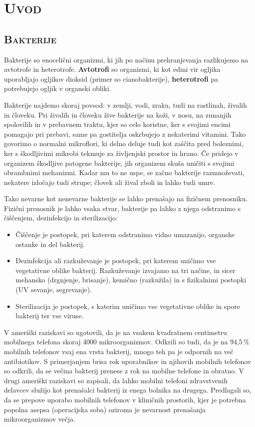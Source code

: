 \documentclass[12pt, a4paper]{report}
\begin{document}
\chapter{\textsc{Uvod}}

\section{\textsc{Bakterije}}

Bakterije so enocelični organizmi, ki jih po načinu prehranjevanja razlikujemo na avtotrofe in heterotrofe. \textbf{Avtotrofi} so organizmi, ki kot edini vir ogljika uporabljajo ogljikov dioksid (primer so cianobakterije), \textbf{heterotrofi} pa potrebujejo ogljik v organski obliki.

Bakterije najdemo skoraj povsod: v zemlji, vodi, zraku, tudi na rastlinah, živalih in človeku. Pri živalih in človeku žive bakterije na koži, v nosu, na zunanjih spolovilih in v prebavnem traktu, kjer so celo koristne, ker s svojimi encimi pomagajo pri prebavi, same pa gostitelja oskrbujejo z nekaterimi vitamini. Tako govorimo o normalni mikroflori, ki delno deluje tudi kot zaščita pred boleznimi, ker s škodljivimi mikrobi tekmuje za življenjski prostor in hrano. Če pridejo v organizem škodljive patogene bakterije, jih organizem skuša uničiti s svojimi obrambnimi mehanizmi. Kadar mu to ne uspe, se začno bakterije razmnoževati, nekatere izločajo tudi strupe; človek ali žival zboli in lahko tudi umre.

Tako nevarne kot nenevarne bakterije se lahko prenašajo na fizičnem prenosniku. Fizični prenosnik je lahko vsaka stvar, bakterije pa lahko z njega odstranimo s čiščenjem, dezinfekcijo in sterilizacijo:
\begin{itemize}
\item Čiščenje je postopek, pri katerem odstranimo vidno umazanijo, organske ostanke in del bakterij.
\item Dezinfekcija ali razkuževanje je postopek, pri katerem uničimo vse vegetativne oblike bakterij. Razkuževanje izvajamo na tri načine, in sicer mehansko (drgnjenje, brisanje), kemično (razkužila) in s fizikalnimi postopki (UV sevanje, segrevanje).
\item Sterilizacija je postopek, s katerim uničimo vse vegetativne oblike in spore bakterij ter vse viruse.
\end{itemize}

V ameriški raziskavi so ugotovili, da je na vsakem kvadratnem centimetru mobilnega telefona skoraj 4000 mikroorganizmov. Odkrili so tudi, da je na 94,5\,\% mobilnih telefonov vsaj ena vrsta bakterij, mnogo teh pa je odpornih na več antibiotikov. S primerjanjem brisa rok uporabnikov in njihovih mobilnih telefonov so odkrili, da se večina bakterij prenese z rok na mobilne telefone in obratno. V drugi ameriški raziskavi so zapisali, da lahko mobilni telefoni zdravstvenih delavcev služijo kot prenašalci bakterij iz enega bolnika na drugega. Predlagali so, da se prepove uporabo mobilnih telefonov v kliničnih prostorih, kjer je potrebna popolna asepsa (operacijska soba) oziroma je nevarnost prenašanja mikroorganizmov večja.
\end{document}
